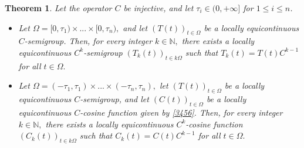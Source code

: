 \documentclass[10pt,a4paper]{amsart}
\newtheorem{thm}{Theorem}
\begin{document}
\begin{thm}\label{nap}
Let the operator $C$ be injective, and let $\tau_{i}\in (0,+\infty]$ for $1\leq i \leq n$. 
\begin{itemize}
\item[(i)] Let $\Omega =[0,\tau_{1}) \times ... \times [0,\tau_{n}),$ and let $(T(t))_{t\in \Omega}$ 
be a locally equicontinuous $C$-semigroup. Then, for every integer $k\in {\mathbb N},$ there exists a locally equicontinuous $C^{k}$-semigroup $(T_{k}(t))_{t\in k\Omega}$ such that $T_{k}(t)=T(t)C^{k-1}$ for all $t\in \Omega.$ 
\item[(ii)] Let $\Omega =(-\tau_{1},\tau_{1}) \times ... \times (-\tau_{n},\tau_{n}),$ let $(T(t))_{t\in \Omega}$ 
be a locally equicontinuous $C$-semigroup, and let $(C(t))_{t\in \Omega}$ 
be a locally equicontinuous $C$-cosine function given by \eqref{3456}. Then, for every integer $k\in {\mathbb N},$ there exists a locally equicontinuous $C^{k}$-cosine function $(C_{k}(t))_{t\in k\Omega}$ such that $C_{k}(t)=C(t)C^{k-1}$ for all $t\in \Omega.$ 
\end{itemize}
\end{thm}
\end{document}
